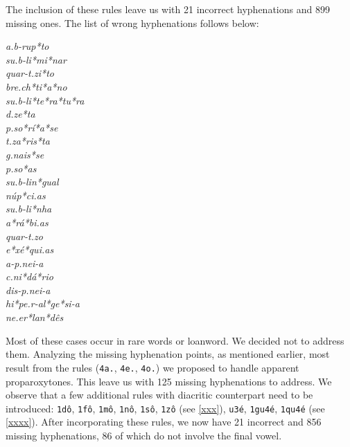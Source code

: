 The inclusion of these rules leave us with 21 incorrect hyphenations and 899 missing ones.
The list of wrong hyphenations follows below:
\begin{multicols}{5}
\setlength{\columnsep}{0pt}
\setlength{\parindent}{0pt}
\emph{a.b-rup*to \\ su.b-li*mi*nar \\ quar-t.zi*to \\ bre.ch*ti*a*no \\ su.b-li*te*ra*tu*ra \\ d.ze*ta \\ p.so*rí*a*se \\ t.za*ris*ta \\ g.nais*se \\ p.so*as \\ su.b-lin*gual \\ núp*ci.as \\ su.b-li*nha \\ a*rá*bi.as \\ quar-t.zo \\ e*xé*qui.as \\ a-p.nei-a \\ c.ni*dá*rio \\ dis-p.nei-a \\ hi*pe.r-al*ge*si-a \\ ne.er*lan*dês}
\end{multicols}
\noindent{}Most of these cases occur in rare words or loanword. We decided not to address them.
Analyzing the missing hyphenation points, as mentioned earlier, most result from the rules (\texttt{4a.}, \texttt{4e.}, \texttt{4o.})
we proposed to handle apparent proparoxytones. This leave us with 125 missing hyphenations to address.
We observe that a few additional rules with diacritic counterpart need to be introduced: 
\texttt{1dô}, \texttt{1fô}, \texttt{1mô}, \texttt{1nô}, \texttt{1sô}, \texttt{1zô} (see \cref{xxx}), 
\texttt{u3é}, \texttt{1gu4é}, \texttt{1qu4é} (see \cref{xxxx}).
After incorporating these rules, we now have 21 incorrect and 856 missing hyphenations, 86 of which do not involve the final vowel.

